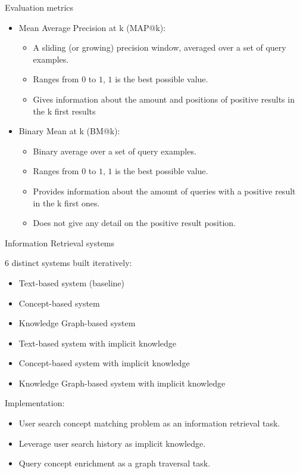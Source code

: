 \begin{frame}{Evaluation metrics}

    \begin{itemize}
        \item Mean Average Precision at k (MAP@k): 
        \begin{itemize}
            \item A sliding (or growing) precision window, averaged over a set of query examples.
            \item Ranges from $0$ to $1$, $1$ is the best possible value.
            \item Gives information about the amount and positions of positive results in the k first results
        \end{itemize}
        \item Binary Mean at k (BM@k):
        \begin{itemize}
            \item Binary average over a set of query examples.
            \item Ranges from $0$ to $1$, $1$ is the best possible value.
            \item Provides information about the amount of queries with a positive result in the k first ones.
            \item Does not give any detail on the positive result position.
        \end{itemize}
    \end{itemize}

\end{frame}

\begin{frame}{Information Retrieval systems}

    6 distinct systems built iteratively:
    \begin{itemize}
        \item Text-based system (baseline)
        \item Concept-based system
        \item Knowledge Graph-based system
        \item Text-based system with implicit knowledge
        \item Concept-based system with implicit knowledge
        \item Knowledge Graph-based system with implicit knowledge
    \end{itemize}

    Implementation:
    \begin{itemize}
        \item User search concept matching problem as an information retrieval task.
        \item Leverage user search history as implicit knowledge.
        \item Query concept enrichment as a graph traversal task.
    \end{itemize}

\end{frame}


